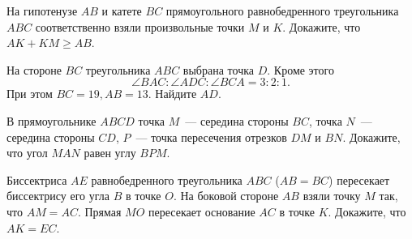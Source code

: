 \begin{problems}
\item На гипотенузе $AB$ и катете $BC$ прямоугольного равнобедренного треугольника $ABC$ соответственно взяли произвольные точки $M$ и $K$. Докажите, что $AK + KM \geqslant AB$.


\item На стороне $BC$ треугольника $ABC$ выбрана точка $D$. Кроме этого $$\angle{BAC}:\angle{ADC}:\angle{BCA}=3:2:1.$$ 
При этом $BC=19, AB=13$. Найдите $AD$.

\item В прямоугольнике $ABCD$ точка $M$~--- середина стороны $BC$, точка $N$~--- середина стороны $CD$, $P$~--- точка пересечения отрезков $DM$ и $BN$. Докажите, что угол $MAN$ равен углу $BPM$.

\item Биссектриса $AE$ равнобедренного треугольника $ABC$ ($AB = BC$) пересекает биссектрису его угла $B$ в точке $O$. На боковой стороне $AB$ взяли точку $M$ так, что $AM = AC$. Прямая $MO$ пересекает основание $AC$ в точке $K$. Докажите, что $AK = EC$.


\end{problems}